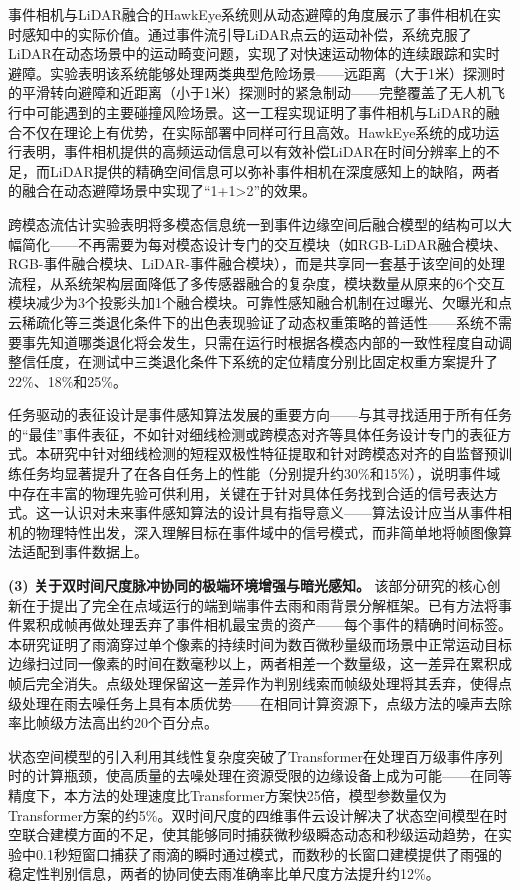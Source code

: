 事件相机与LiDAR融合的HawkEye系统则从动态避障的角度展示了事件相机在实时感知中的实际价值。通过事件流引导LiDAR点云的运动补偿，系统克服了LiDAR在动态场景中的运动畸变问题，实现了对快速运动物体的连续跟踪和实时避障。实验表明该系统能够处理两类典型危险场景——远距离（大于1米）探测时的平滑转向避障和近距离（小于1米）探测时的紧急制动——完整覆盖了无人机飞行中可能遇到的主要碰撞风险场景。这一工程实现证明了事件相机与LiDAR的融合不仅在理论上有优势，在实际部署中同样可行且高效。HawkEye系统的成功运行表明，事件相机提供的高频运动信息可以有效补偿LiDAR在时间分辨率上的不足，而LiDAR提供的精确空间信息可以弥补事件相机在深度感知上的缺陷，两者的融合在动态避障场景中实现了“1+1>2”的效果。

跨模态流估计实验表明将多模态信息统一到事件边缘空间后融合模型的结构可以大幅简化——不再需要为每对模态设计专门的交互模块（如RGB-LiDAR融合模块、RGB-事件融合模块、LiDAR-事件融合模块），而是共享同一套基于该空间的处理流程，从系统架构层面降低了多传感器融合的复杂度，模块数量从原来的6个交互模块减少为3个投影头加1个融合模块。可靠性感知融合机制在过曝光、欠曝光和点云稀疏化等三类退化条件下的出色表现验证了动态权重策略的普适性——系统不需要事先知道哪类退化将会发生，只需在运行时根据各模态内部的一致性程度自动调整信任度，在测试中三类退化条件下系统的定位精度分别比固定权重方案提升了22\%、18\%和25\%。

任务驱动的表征设计是事件感知算法发展的重要方向——与其寻找适用于所有任务的“最佳”事件表征，不如针对细线检测或跨模态对齐等具体任务设计专门的表征方式。本研究中针对细线检测的短程双极性特征提取和针对跨模态对齐的自监督预训练任务均显著提升了在各自任务上的性能（分别提升约30\%和15\%），说明事件域中存在丰富的物理先验可供利用，关键在于针对具体任务找到合适的信号表达方式。这一认识对未来事件感知算法的设计具有指导意义——算法设计应当从事件相机的物理特性出发，深入理解目标在事件域中的信号模式，而非简单地将帧图像算法适配到事件数据上。

\textbf{(3) 关于双时间尺度脉冲协同的极端环境增强与暗光感知。} 该部分研究的核心创新在于提出了完全在点域运行的端到端事件去雨和雨背景分解框架。已有方法将事件累积成帧再做处理丢弃了事件相机最宝贵的资产——每个事件的精确时间标签。本研究证明了雨滴穿过单个像素的持续时间为数百微秒量级而场景中正常运动目标边缘扫过同一像素的时间在数毫秒以上，两者相差一个数量级，这一差异在累积成帧后完全消失。点级处理保留这一差异作为判别线索而帧级处理将其丢弃，使得点级处理在雨去噪任务上具有本质优势——在相同计算资源下，点级方法的噪声去除率比帧级方法高出约20个百分点。

状态空间模型的引入利用其线性复杂度突破了Transformer在处理百万级事件序列时的计算瓶颈，使高质量的去噪处理在资源受限的边缘设备上成为可能——在同等精度下，本方法的处理速度比Transformer方案快25倍，模型参数量仅为Transformer方案的约5\%。双时间尺度的四维事件云设计解决了状态空间模型在时空联合建模方面的不足，使其能够同时捕获微秒级瞬态动态和秒级运动趋势，在实验中0.1秒短窗口捕获了雨滴的瞬时通过模式，而数秒的长窗口建模提供了雨强的稳定性判别信息，两者的协同使去雨准确率比单尺度方法提升约12\%。

